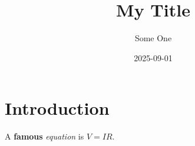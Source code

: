 \documentclass{article}
\title{My Title}
\author{Some One}
\date{2025-09-01}
\begin{document}
\maketitle

\section{Introduction}

A \textbf{famous} \textit{equation} is $V = IR$.
\end{document}
